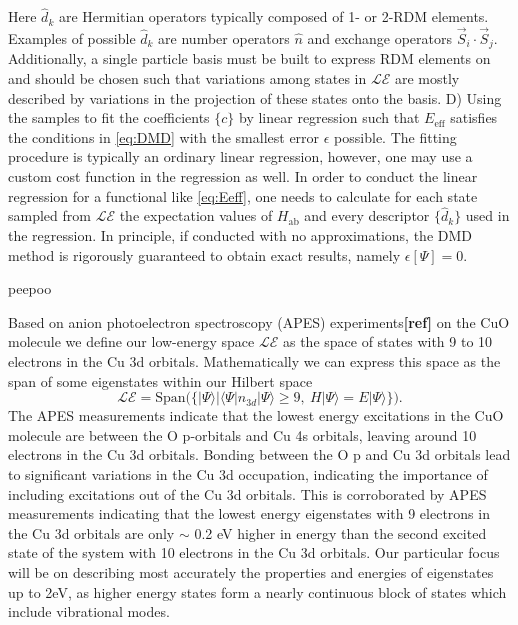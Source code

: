 \documentclass{article}
\begin{document}
Here $\hat{d}_k$ are Hermitian operators typically composed of 1- or 2-RDM elements. 
Examples of possible $\hat{d}_k$ are number operators $\hat{n}$ and exchange operators $\vec{S}_i \cdot \vec{S}_j$.
Additionally, a single particle basis must be built to express RDM elements on and should be chosen such that variations among states in $\mathcal{LE}$ are mostly described by variations in the projection of these states onto the basis.
D) Using the samples to fit the coefficients $\{c\}$ by linear regression such that $E_\text{eff}$ satisfies the conditions in \eqref{eq:DMD} with the smallest error $\epsilon$ possible. 
The fitting procedure is typically an ordinary linear regression, however, one may use a custom cost function in the regression as well. 
In order to conduct the linear regression for a functional like \eqref{eq:Eeff}, one needs to calculate for each state sampled from $\mathcal{LE}$ the expectation values of $H_\text{ab}$ and every descriptor $\{\hat{d}_k\}$ used in the regression.
In principle, if conducted with no approximations, the DMD method is rigorously guaranteed to obtain exact results, namely $\epsilon[\Psi] = 0$.

\pagebreak
peepoo

\pagebreak

Based on anion photoelectron spectroscopy (APES) experiments\textbf{[ref]} on the CuO molecule we define our low-energy space $\mathcal{LE}$ as the space of states with 9 to 10 electrons in the Cu 3d orbitals. 
Mathematically we can express this space as the span of some eigenstates within our Hilbert space
\begin{equation}
\mathcal{LE} = \text{Span(}\{ |\Psi \rangle | \langle \Psi | n_{3d} | \Psi \rangle \ge 9,\ H|\Psi\rangle = E |\Psi\rangle \}\text{)}.
\end{equation}
The APES measurements indicate that the lowest energy excitations in the CuO molecule are between the O p-orbitals and Cu 4s orbitals, leaving around 10 electrons in the Cu 3d orbitals. 
Bonding between the O p and Cu 3d orbitals lead to significant variations in the Cu 3d occupation, indicating the importance of including excitations out of the Cu 3d orbitals. 
This is corroborated by APES measurements indicating that the lowest energy eigenstates with 9 electrons in the Cu 3d orbitals are only $\sim$ 0.2 eV higher in energy than the second excited state of the system with 10 electrons in the Cu 3d orbitals. 
Our particular focus will be on describing most accurately the properties and energies of eigenstates up to 2eV, as higher energy states form a nearly continuous block of states which include vibrational modes.
\end{document}
